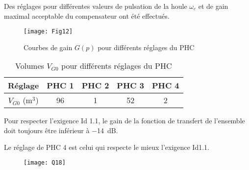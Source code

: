 \ifprof
\else
Des réglages pour différentes valeurs de pulsation de la houle $\omega_c$ et de gain maximal acceptable du compensateur ont été effectués. 



\begin{figure}[H]
\centering
\texttt{[image: Fig12]}
\caption{Courbes de gain $G(p)$ pour différents réglages du PHC}
\label{Fig12}
\end{figure}



\begin{table}[!h]
\centering
\begin{tabular}{ccccc}
\hline
Réglage &PHC 1& PHC 2 &PHC 3 &PHC 4\\
\hline
\hline
$V_{G0}$ (m$^3$) &96& 1& 52& 2\\
\hline
\end{tabular}
\caption{Volumes $V_{G0}$ pour différents réglages du PHC}
\label{tab2}
\end{table}



Pour respecter l’exigence Id 1.1, le gain de la fonction de transfert de l’ensemble doit toujours être inférieur à \SI{-14}{dB}.\\


\fi

\ifprof
\begin{corrige}
Le réglage de PHC 4 est celui qui respecte le mieux l’exigence Id1.1. 

\begin{figure}[H]
\centering
\texttt{[image: Q18]}
\end{figure}


\end{corrige}
\else
\fi


